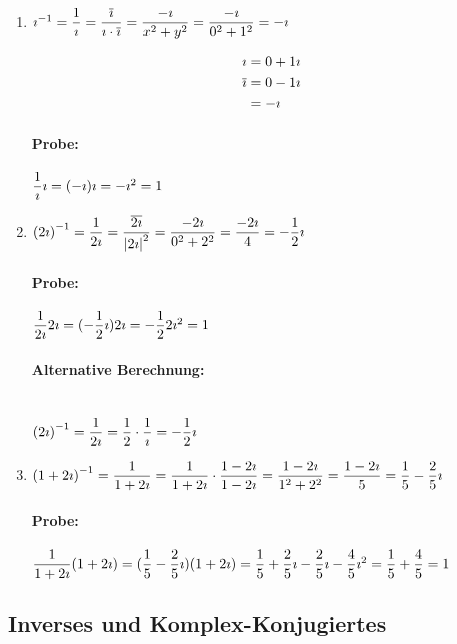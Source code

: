 \Bsps
\begin{enumerate}
	\item ${\imath }^{-1}=\dfrac{1}{\imath }=\dfrac{\overline{\imath }}{\imath \cdot\overline{\imath }}=\dfrac{-\imath }{x^2+y^2}=\dfrac{-\imath }{0^2+1^2}=-\imath $
	
	\begin{align*}
	\imath &=0+1\imath\\
	\overline{\imath }&= 0-1\imath \\
	&= -\imath 
	\end{align*}
	
	\paragraph{Probe:} $\dfrac{1}{\imath }\imath =(-\imath )\imath = -\imath ^2=1$
	
	\item ${(2\imath )}^{-1}=\dfrac{1}{2\imath }=\dfrac{\overline{2\imath }}{{|2\imath |}^2}=\dfrac{-2\imath }{0^2+2^2}=\dfrac{-2\imath }{4}=-\dfrac{1}{2}\imath $
	
	\paragraph{Probe:} $\dfrac{1}{2\imath }2\imath =(-\dfrac{1}{2}\imath )2\imath = -\dfrac{1}{2}2\imath ^2=1$
	
	\paragraph{Alternative Berechnung:} \quad\\
	${(2\imath )}^{-1}=\dfrac{1}{2\imath }=\dfrac{1}{2}\cdot\dfrac{1}{\imath }=-\dfrac{1}{2}\imath $
	
	\item ${(1+2\imath )}^{-1}=\dfrac{1}{1+2\imath }=\dfrac{1}{1+2\imath }\cdot\dfrac{1-2\imath }{1-2\imath }=\dfrac{1-2\imath }{1^2+2^2}=\dfrac{1-2\imath }{5}=\dfrac{1}{5}-\dfrac{2}{5}\imath $
	
	\paragraph{Probe:} $\dfrac{1}{1+2\imath }(1+2\imath )=(\dfrac{1}{5}-\dfrac{2}{5}\imath )(1+2\imath )=\dfrac{1}{5}+\dfrac{2}{5}\imath -\dfrac{2}{5}\imath -\dfrac{4}{5}\imath ^2=\dfrac{1}{5}+\dfrac{4}{5}=1$
\end{enumerate}

\clearpage
\subsection{Inverses und Komplex-Konjugiertes}

